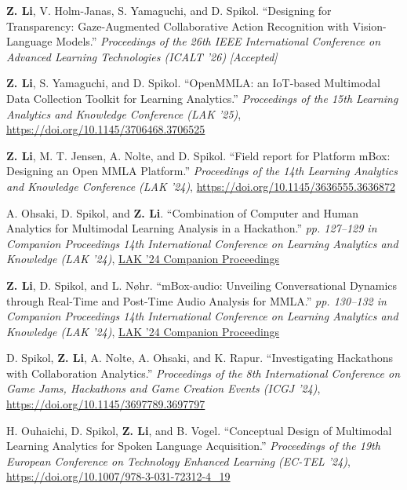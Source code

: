 \documentclass[11pt,letterpaper]{report}
\begin{document}
    \begin{tablist}
        \item[2026] \tab{} \textbf{Z. Li}, V. Holm-Janas, S. Yamaguchi, and D. Spikol. \enquote{Designing for Transparency: Gaze-Augmented Collaborative Action Recognition with Vision-Language Models.} \textit{Proceedings of the 26th IEEE International Conference on Advanced Learning Technologies (ICALT '26)} \textit{[Accepted]}
        \item[2025] \tab{} \textbf{Z. Li}, S. Yamaguchi, and D. Spikol. \enquote{OpenMMLA: an IoT-based Multimodal Data Collection Toolkit for Learning Analytics.} \textit{Proceedings of the 15th Learning Analytics and Knowledge Conference (LAK '25)}, \href{https://doi.org/10.1145/3706468.3706525}{https://doi.org/10.1145/3706468.3706525}
        \item[2024] \tab{} \textbf{Z. Li}, M. T. Jensen, A. Nolte, and D. Spikol. \enquote{Field report for Platform mBox: Designing an Open MMLA Platform.} \textit{Proceedings of the 14th Learning Analytics and Knowledge Conference (LAK '24)}, \href{https://doi.org/10.1145/3636555.3636872}{https://doi.org/10.1145/3636555.3636872}
        \item[2024] \tab{} A. Ohsaki, D. Spikol, and \textbf{Z. Li}. \enquote{Combination of Computer and Human Analytics for Multimodal Learning Analysis in a Hackathon.} \textit{pp. 127--129 in Companion Proceedings 14th International Conference on Learning Analytics and Knowledge (LAK '24)}, \href{https://www.solaresearch.org/wp-content/uploads/2024/03/LAK24_CompanionProceedings.pdf}{LAK '24 Companion Proceedings}
        \item[2024] \tab{} \textbf{Z. Li}, D. Spikol, and L. Nøhr. \enquote{mBox-audio: Unveiling Conversational Dynamics through Real-Time and Post-Time Audio Analysis for MMLA.} \textit{pp. 130--132 in Companion Proceedings 14th International Conference on Learning Analytics and Knowledge (LAK '24)}, \href{https://www.solaresearch.org/wp-content/uploads/2024/03/LAK24_CompanionProceedings.pdf}{LAK '24 Companion Proceedings}
        \item[2024] \tab{} D. Spikol, \textbf{Z. Li}, A. Nolte, A. Ohsaki, and K. Rapur. \enquote{Investigating Hackathons with Collaboration Analytics.} \textit{Proceedings of the 8th International Conference on Game Jams, Hackathons and Game Creation Events (ICGJ '24)}, \href{https://doi.org/10.1145/3697789.3697797}{https://doi.org/10.1145/3697789.3697797}
        \item[2024] \tab{} H. Ouhaichi, D. Spikol, \textbf{Z. Li}, and B. Vogel. \enquote{Conceptual Design of Multimodal Learning Analytics for Spoken Language Acquisition.} \textit{Proceedings of the 19th European Conference on Technology Enhanced Learning (EC-TEL '24)}, \href{https://doi.org/10.1007/978-3-031-72312-4_19}{https://doi.org/10.1007/978-3-031-72312-4\_19}

\end{tablist}
\end{document}
